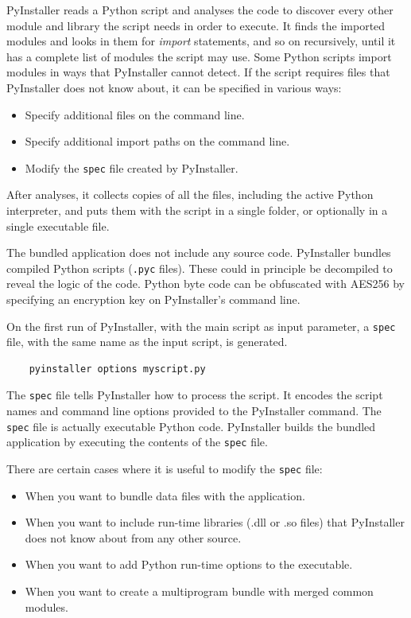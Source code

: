 PyInstaller reads a Python script and analyses the code to discover every other module and library the script needs in order to execute.
It finds the imported modules and looks in them for \textit{import} statements, and so on recursively, until it has a complete list of modules the script may use.
Some Python scripts import modules in ways that PyInstaller cannot detect. If the script requires files that PyInstaller does not know about, it can be specified in various ways:

\begin{itemize}
  \item Specify additional files on the command line.
  \item Specify additional import paths on the command line.
  \item Modify the \texttt{spec} file created by PyInstaller.
\end{itemize}

After analyses, it collects copies of all the files, including the active Python interpreter, and puts them with the script in a single folder, or optionally in a single executable file.

The bundled application does not include any source code. PyInstaller bundles compiled Python scripts (\texttt{.pyc} files). These could in principle be decompiled to reveal the logic of the code.
Python byte code can be obfuscated with AES256 by specifying an encryption key on PyInstaller’s command line.

On the first run of PyInstaller, with the main script as input parameter, a \texttt{spec} file, with the same name as the input script, is generated.

\footnotesize
\begin{lstlisting}
    pyinstaller options myscript.py
\end{lstlisting}
\normalsize

The \texttt{spec} file tells PyInstaller how to process the script. It encodes the script names and command line options provided to the PyInstaller command. The \texttt{spec} file is actually executable Python code. PyInstaller builds the bundled application by executing the contents of the \texttt{spec} file.

There are certain cases where it is useful to modify the \texttt{spec} file:

\begin{itemize}
  \item When you want to bundle data files with the application.
  \item When you want to include run-time libraries (.dll or .so files) that PyInstaller does not know about from any other source.
  \item When you want to add Python run-time options to the executable.
  \item When you want to create a multiprogram bundle with merged common modules.
\end{itemize}


